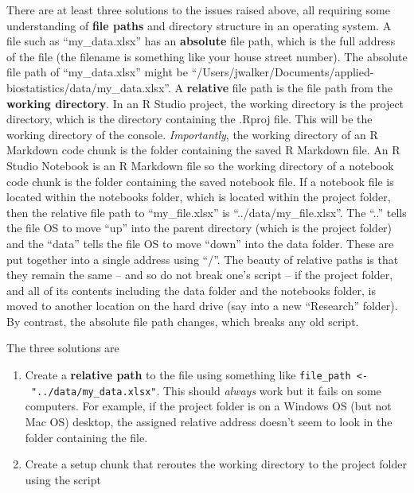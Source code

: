 \documentclass[]{book}
\providecommand{\tightlist}{%
  \setlength{\itemsep}{0pt}\setlength{\parskip}{0pt}}
\begin{document}
There are at least three solutions to the issues raised above, all requiring some understanding of \textbf{file paths} and directory structure in an operating system. A file such as ``my\_data.xlsx'' has an \textbf{absolute} file path, which is the full address of the file (the filename is something like your house street number). The absolute file path of ``my\_data.xlsx'' might be ``/Users/jwalker/Documents/applied-biostatistics/data/my\_data.xlsx''. A \textbf{relative} file path is the file path from the \textbf{working directory}. In an R Studio project, the working directory is the project directory, which is the directory containing the .Rproj file. This will be the working directory of the console. \emph{Importantly}, the working directory of an R Markdown code chunk is the folder containing the saved R Markdown file. An R Studio Notebook is an R Markdown file so the working directory of a notebook code chunk is the folder containing the saved notebook file. If a notebook file is located within the notebooks folder, which is located within the project folder, then the relative file path to ``my\_file.xlsx'' is ``../data/my\_file.xlsx''. The ``..'' tells the file OS to move ``up'' into the parent directory (which is the project folder) and the ``data'' tells the file OS to move ``down'' into the data folder. These are put together into a single address using ``/''. The beauty of relative paths is that they remain the same -- and so do not break one's script -- if the project folder, and all of its contents including the data folder and the notebooks folder, is moved to another location on the hard drive (say into a new ``Research'' folder). By contrast, the absolute file path changes, which breaks any old script.

The three solutions are

\begin{enumerate}
\def\labelenumi{\arabic{enumi}.}
\tightlist
\item
  Create a \textbf{relative path} to the file using something like \texttt{file\_path\ \textless{}-\ "../data/my\_data.xlsx"}. This should \emph{always} work but it fails on some computers. For example, if the project folder is on a Windows OS (but not Mac OS) desktop, the assigned relative address doesn't seem to look in the folder containing the file.
\item
  Create a setup chunk that reroutes the working directory to the project folder using the script
\end{enumerate}
\end{document}

